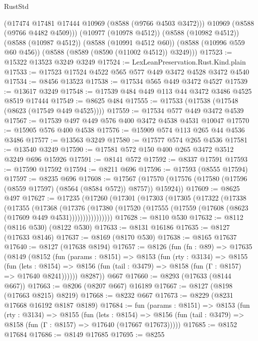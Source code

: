 \begin{lexlean}{RustStd}
\begin{coremodule}
        (@17474 @17481 @17444 @10969 (@8588 (@9766 @4503 @3472)))
        @10969
        (@8588 (@9766 @4482 @4509)))
      (@10977 (@10978 @4512))
      (@8588 (@10982 @4512))
      (@8588 (@10987 @4512))
      (@8588 (@10991 @4512 @60))
      (@8588 (@10996 @559 @60 @456))
      (@8588 (@8589 (@8590 (@11002 @4512)) @3249)))
@17523 := @15322 @13523 @3249 @3249
@17524 := LexLeanPreservation.Rust.Kind.plain
@17533 := @17523 @17524 @4522 @565 @577 @449 @3472 @4528 @3472 @4540
@17534 := @8456 @13523
@17538 := @17534 @565 @449 @3472 @4527
@17539 := @13617 @3249
@17548 := @17539 @484 @449 @113 @44 @3472 @3486 @4525 @8519 @17444
@17549 := @8625 @484
@17555 := @17533 (@17538 (@17548 (@8623 (@17549 @449 @4525))))
@17559 := @17534 @577 @449 @3472 @4539
@17567 := @17539 @497 @449 @576 @400 @3472 @4538 @4531 @10047
@17570 := @15905 @576 @400 @4538
@17576 := @15909 @574 @113 @265 @44 @4536 @3486
@17577 := @13563 @3249
@17580 := @17577 @574 @265 @4536
@17581 := @13540 @3249
@17590 := @17581 @572 @150 @400 @265 @3472 @3512 @3249 @696 @15926
@17591 := @8141 @572
@17592 := @8337 @17591
@17593 := @17590 @17592
@17594 := @8211 @696
@17596 := @17593 (@8555 @17594)
@17597 := @8235 @696
@17608 := @17567
    (@17570 (@17576 (@17580 (@17596 (@8559 @17597) (@8564 (@8584 @572)) @8757)) @15924))
@17609 := @8625 @497
@17627 := @17235
    (@17260
      (@17301
        (@17303
          (@17305
            (@17322
              (@17338
                (@17355
                  (@17368
                    (@17376
                      (@17380
                        (@17520 (@17555 (@17559 (@17608 (@8623 (@17609 @449 @4531))))))))))))))))
@17628 := @8110 @530
@17632 := @8112 (@8116 @530) (@8122 @530)
@17633 := @8131 @16186
@17635 := @8127 (@17633 @8146)
@17637 := @8169 (@8170 @530)
@17638 := @8165 @17637
@17640 := @8127 (@17638 @8194)
@17657 := @8126
    (fun (fn : @89) =>
    @17635
      (@8149
        (@8152
          (fun (params : @8151) =>
          @8153
            (fun (rty : @3134) =>
            @8155
              (fun (lets : @8154) =>
              @8156 (fun (tail : @3479) => @8158 (fun (Γ : @8157) => @17640 @8241))))))
        @8287))
    @667
@17660 := @8293 (@17633 (@8144 @667))
@17663 := @8206 (@8207 @667) @16189
@17667 := @8127 (@8198 (@17663 @8215) @8219)
@17668 := @8232 @667
@17673 := @8229 (@8231 @17668 @16192 @8187 @8189)
@17684 := fun (params : @8151) =>
  @8153
    (fun (rty : @3134) =>
    @8155
      (fun (lets : @8154) =>
      @8156 (fun (tail : @3479) => @8158 (fun (Γ : @8157) => @17640 (@17667 @17673)))))
@17685 := @8152 @17684
@17686 := @8149 @17685
@17695 := @8255

\end{coremodule}
\end{lexlean}
